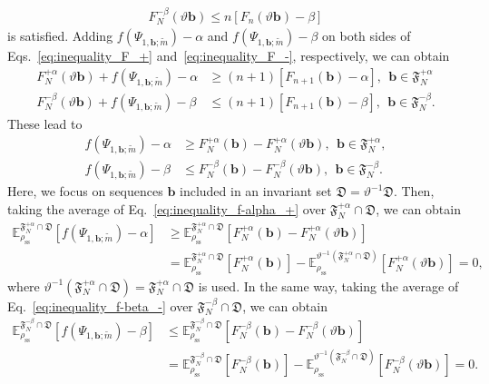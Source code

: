 \documentclass[preprint,pteplogo]{ptephy_v2}%
\numberwithin{equation}{section}
\theoremstyle{definition}
\begin{document}
\begin{align}
    F_N^{-\beta}(\vartheta\bm{b}) \leq n\left[F_n(\vartheta\bm{b})-\beta\right]
    \label{eq:inequality_F_-}
\end{align}
is satisfied. 
Adding $f(\Psi_{1,\bm{b};\tilde{m}})-\alpha$ and $f(\Psi_{1,\bm{b};\tilde{m}})-\beta$ on both sides of Eqs.~\eqref{eq:inequality_F_+} and~\eqref{eq:inequality_F_-}, respectively, we can obtain
\begin{align}
    F_N^{+\alpha}(\vartheta\bm{b})+f(\Psi_{1,\bm{b};\tilde{m}})-\alpha &\geq (n+1)\left[F_{n+1}(\bm{b})-\alpha\right],\ \ 
    \bm{b}\in\mathfrak{F}_N^{+\alpha}\\ 
    F_N^{-\beta}(\vartheta\bm{b})+f(\Psi_{1,\bm{b};\tilde{m}})-\beta &\leq (n+1)\left[F_{n+1}(\bm{b})-\beta\right],\ \ 
    \bm{b}\in\mathfrak{F}_N^{-\beta}.
\end{align}
These lead to
\begin{align}
    f(\Psi_{1,\bm{b};\tilde{m}})-\alpha &\geq F_N^{+\alpha}(\bm{b})-F_N^{+\alpha}(\vartheta\bm{b}),\ \ \bm{b}\in\mathfrak{F}_N^{+\alpha},
    \label{eq:inequality_f-alpha_+}\\ 
    f(\Psi_{1,\bm{b};\tilde{m}})-\beta &\leq F_N^{-\beta}(\bm{b})-F_N^{-\beta}(\vartheta\bm{b}),\ \ \bm{b}\in\mathfrak{F}_N^{-\beta}.
    \label{eq:inequality_f-beta_-}
\end{align}
Here, we focus on sequences $\bm{b}$ included in an invariant set $\mathfrak{D}=\vartheta^{-1}\mathfrak{D}$. 
Then, taking the average of Eq.~\eqref{eq:inequality_f-alpha_+} over $\mathfrak{F}_N^{+\alpha} \cap \mathfrak{D}$, we can obtain 
\begin{align}
    \mathbb{E}_{\rho_\mathrm{ss}}^{\mathfrak{F}_N^{+\alpha} \cap \mathfrak{D}}\left[f(\Psi_{1,\bm{b};\tilde{m}})-\alpha\right]&\geq \mathbb{E}_{\rho_\mathrm{ss}}^{\mathfrak{F}_N^{+\alpha} \cap \mathfrak{D}}\left[F_N^{+\alpha}(\bm{b})-F_N^{+\alpha}(\vartheta\bm{b})\right]\nonumber\\&=\mathbb{E}_{\rho_\mathrm{ss}}^{\mathfrak{F}_N^{+\alpha} \cap \mathfrak{D}}\left[F_N^{+\alpha}(\bm{b})\right]-\mathbb{E}_{\rho_\mathrm{ss}}^{\vartheta^{-1}(\mathfrak{F}_N^{+\alpha} \cap \mathfrak{D})}\left[F_N^{+\alpha}(\vartheta\bm{b})\right]=0,
\end{align}
where $\vartheta^{-1}(\mathfrak{F}_N^{+\alpha} \cap \mathfrak{D})=\mathfrak{F}_N^{+\alpha} \cap \mathfrak{D}$ is used. 
In the same way, taking the average of Eq.~\eqref{eq:inequality_f-beta_-} over $\mathfrak{F}_N^{-\beta} \cap \mathfrak{D}$, we can obtain
\begin{align}
    \mathbb{E}_{\rho_\mathrm{ss}}^{\mathfrak{F}_N^{-\beta} \cap \mathfrak{D}}\left[f(\Psi_{1,\bm{b};\tilde{m}})-\beta\right]&\leq \mathbb{E}_{\rho_\mathrm{ss}}^{\mathfrak{F}_N^{-\beta} \cap \mathfrak{D}}\left[F_N^{-\beta}(\bm{b})-F_N^{-\beta}(\vartheta\bm{b})\right]\nonumber\\&=\mathbb{E}_{\rho_\mathrm{ss}}^{\mathfrak{F}_N^{-\beta} \cap \mathfrak{D}}\left[F_N^{-\beta}(\bm{b})\right]-\mathbb{E}_{\rho_\mathrm{ss}}^{\vartheta^{-1}(\mathfrak{F}_N^{-\beta} \cap \mathfrak{D})}\left[F_N^{-\beta}(\vartheta\bm{b})\right]=0.
\end{align}
\end{document}
